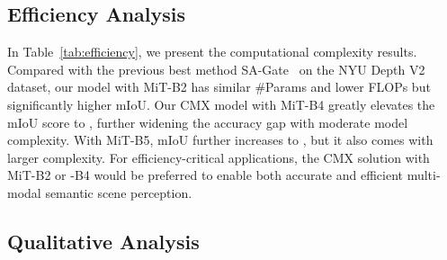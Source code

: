 \documentclass[journal]{IEEEtran}
\begin{document}
\subsection{Efficiency Analysis}
\label{sec:efficiency_analysis}
In Table~\ref{tab:efficiency}, we present the computational complexity results. Compared with the previous best method SA-Gate~\cite{chen2020sa_gate} on the NYU Depth V2 dataset, our model with MiT-B2 has similar \#Params and lower FLOPs but significantly higher mIoU. Our CMX model with MiT-B4 greatly elevates the mIoU score to , further widening the accuracy gap with moderate model complexity.
With MiT-B5, mIoU further increases to , but it also comes with larger complexity.
For efficiency-critical applications, the CMX solution with MiT-B2 or -B4 would be preferred to enable both accurate and efficient multi-modal semantic scene perception.
\begin{table}[!t]
    \begin{center}
    \caption{\textsc{Efficiency results. FLOPs are estimated for inputs of RGB and HHA, with a size of .}}
    \label{tab:efficiency}
    \end{center}
\end{table}
\subsection{Qualitative Analysis}
\label{sec:qualitative_analysis}
\end{document}
